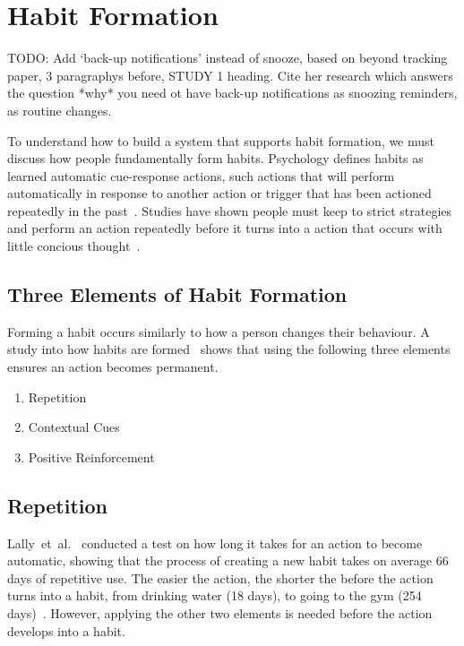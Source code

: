 \newpage

\section{Habit Formation}

TODO: Add `back-up notifications' instead of snooze, based on beyond tracking paper, 3 paragraphys before, STUDY 1 heading. Cite her research which answers the question *why* you need ot have back-up notifications as snoozing reminders, as routine changes.

To understand how to build a system that supports habit formation, we must discuss how people fundamentally form habits.\newline
\newline
Psychology defines habits as learned automatic cue-response actions, such actions that will perform automatically in response to another action or trigger that has been actioned repeatedly in the past~\cite{article_the_habitual_consumer}. Studies have shown people must keep to strict strategies and perform an action repeatedly before it turns into a action that occurs with little concious thought~\cite{article_promoting_habit_formation}.

\subsection{Three Elements of Habit Formation}
Forming a habit occurs similarly to how a person changes their behaviour. A study into how habits are formed~\cite{article_experiences_of_habit_formation} shows that using the following three elements ensures an action becomes permanent.

\begin{enumerate}
  \item Repetition
  \item Contextual Cues
  \item Positive Reinforcement
\end{enumerate}

\subsection*{Repetition}
Lally~et~al.~\cite{article_how_habits_formed_modelling_habit_formation} conducted a test on how long it takes for an action to become automatic, showing that the process of creating a new habit takes on average 66 days of repetitive use. The easier the action, the shorter the before the action turns into a habit, from drinking water (18 days), to going to the gym (254 days)~\cite{article_how_habits_formed_modelling_habit_formation}. However, applying the other two elements is needed before the action develops into a habit.

